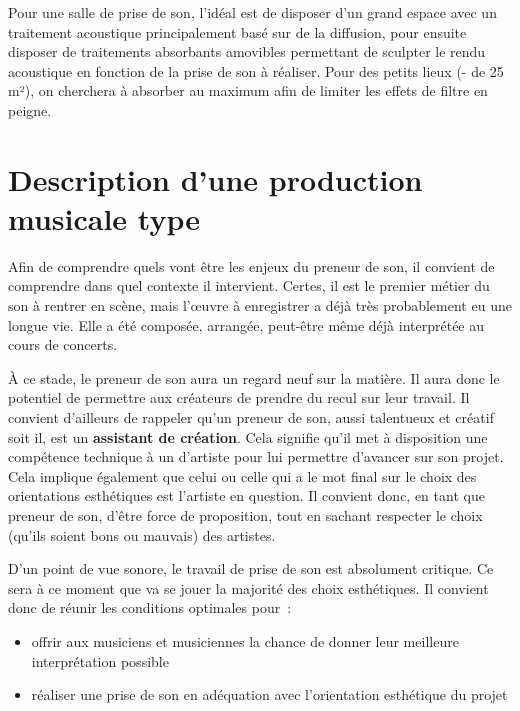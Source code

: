 \documentclass[
]{book}
\providecommand{\tightlist}{%
  \setlength{\itemsep}{0pt}\setlength{\parskip}{0pt}}
\begin{document}
Pour une salle de prise de son, l'idéal est de disposer d'un grand espace avec un traitement acoustique principalement basé sur de la diffusion, pour ensuite disposer de traitements absorbants amovibles permettant de sculpter le rendu acoustique en fonction de la prise de son à réaliser. Pour des petits lieux (- de 25 m²), on cherchera à absorber au maximum afin de limiter les effets de filtre en peigne.

\hypertarget{description-dune-production-musicale-type}{%
\chapter{Description d'une production musicale type}\label{description-dune-production-musicale-type}}

Afin de comprendre quels vont être les enjeux du preneur de son, il convient de comprendre dans quel contexte il intervient. Certes, il est le premier métier du son à rentrer en scène, mais l'œuvre à enregistrer a déjà très probablement eu une longue vie. Elle a été composée, arrangée, peut-être même déjà interprétée au cours de concerts.

À ce stade, le preneur de son aura un regard neuf sur la matière. Il aura donc le potentiel de permettre aux créateurs de prendre du recul sur leur travail. Il convient d'ailleurs de rappeler qu'un preneur de son, aussi talentueux et créatif soit il, est un \textbf{assistant de création}. Cela signifie qu'il met à disposition une compétence technique à un d'artiste pour lui permettre d'avancer sur son projet. Cela implique également que celui ou celle qui a le mot final sur le choix des orientations esthétiques est l'artiste en question. Il convient donc, en tant que preneur de son, d'être force de proposition, tout en sachant respecter le choix (qu'ils soient bons ou mauvais) des artistes.

D'un point de vue sonore, le travail de prise de son est absolument critique. Ce sera à ce moment que va se jouer la majorité des choix esthétiques. Il convient donc de réunir les conditions optimales pour~:

\begin{itemize}
\tightlist
\item
  offrir aux musiciens et musiciennes la chance de donner leur meilleure interprétation possible
\item
  réaliser une prise de son en adéquation avec l'orientation esthétique du projet
\end{itemize}
\end{document}
